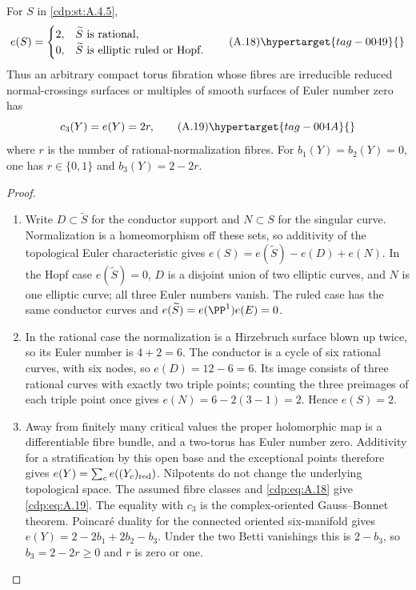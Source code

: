 \begin{proposition}\hypertarget{tag-01AV}{}\label{cdp:st:A.4.6}

For $S$ in \ref{cdp:st:A.4.5},
\[
e(S)=\begin{cases}
2,&\widetilde S\text{ is rational},\\
0,&\widetilde S\text{ is elliptic ruled or Hopf}.
\end{cases}
\tag{A.18}\hypertarget{tag-0049}{}\label{cdp:eq:A.18}
\]
Thus an arbitrary compact torus fibration whose fibres are irreducible reduced normal-crossings surfaces or multiples of smooth surfaces of Euler number zero has
\[
c_3(Y)=e(Y)=2r,
\tag{A.19}\hypertarget{tag-004A}{}\label{cdp:eq:A.19}
\]
where $r$ is the number of rational-normalization fibres. For $b_1(Y)=b_2(Y)=0$, one has $r\in\{0,1\}$ and $b_3(Y)=2-2r$.
\end{proposition}


\begin{proof}

\begin{enumerate}[label=\arabic*.,leftmargin=*]
\item Write $D\subset\widetilde S$ for the conductor support and $N\subset S$ for the singular curve. Normalization is a homeomorphism off these sets, so additivity of the topological Euler characteristic gives $e(S)=e(\widetilde S)-e(D)+e(N)$. In the Hopf case $e(\widetilde S)=0$, $D$ is a disjoint union of two elliptic curves, and $N$ is one elliptic curve; all three Euler numbers vanish. The ruled case has the same conductor curves and $e(\widetilde S)=e(\PP^1)e(E)=0$.

\item In the rational case the normalization is a Hirzebruch surface blown up twice, so its Euler number is $4+2=6$. The conductor is a cycle of six rational curves, with six nodes, so $e(D)=12-6=6$. Its image consists of three rational curves with exactly two triple points; counting the three preimages of each triple point once gives $e(N)=6-2(3-1)=2$. Hence $e(S)=2$.

\item Away from finitely many critical values the proper holomorphic map is a differentiable fibre bundle, and a two-torus has Euler number zero. Additivity for a stratification by this open base and the exceptional points therefore gives $e(Y)=\sum_c e((Y_c)_{\rm red})$. Nilpotents do not change the underlying topological space. The assumed fibre classes and \eqref{cdp:eq:A.18} give \eqref{cdp:eq:A.19}. The equality with $c_3$ is the complex-oriented Gauss--Bonnet theorem. Poincar\'e duality for the connected oriented six-manifold gives $e(Y)=2-2b_1+2b_2-b_3$. Under the two Betti vanishings this is $2-b_3$, so $b_3=2-2r\ge0$ and $r$ is zero or one.

\end{enumerate}
\end{proof}